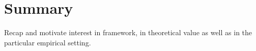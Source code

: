 \documentclass[12pt,letterpaper]{article}
\begin{document}
\section{Summary}
Recap and motivate interest in framework, in theoretical value as well as in the particular empirical setting.

\end{document}
